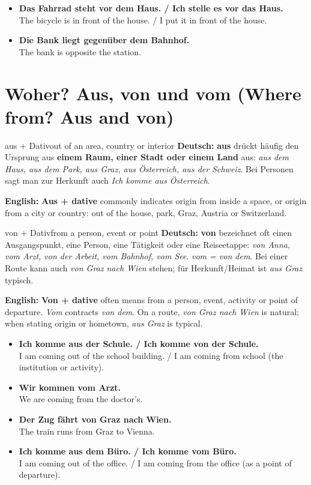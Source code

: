 \documentclass[a4paper,11pt]{article}
\newcommand{\GermanText}[1]{\textbf{Deutsch: }#1\par}
\newcommand{\EnglishText}[1]{{\small\color{SoftGray}\textbf{English: }#1\par}}
\newcommand{\ExampleItem}[2]{\item \textbf{#1}\\{\small\color{SoftGray}#2}}
\begin{document}
\begin{exbox}\begin{itemize}
\ExampleItem{Das Fahrrad steht vor dem Haus. / Ich stelle es vor das Haus.}{The bicycle is in front of the house. / I put it in front of the house.}
\ExampleItem{Die Bank liegt gegenüber dem Bahnhof.}{The bank is opposite the station.}
\end{itemize}\end{exbox}

\section{Woher? Aus, von und vom (Where from? Aus and von)}
\begin{grammarentry}{aus + Dativ}{out of an area, country or interior}
\GermanText{\textbf{aus} drückt häufig den Ursprung aus \textbf{einem Raum, einer Stadt oder einem Land} aus: \emph{aus dem Haus, aus dem Park, aus Graz, aus Österreich, aus der Schweiz}. Bei Personen sagt man zur Herkunft auch \emph{Ich komme aus Österreich}.}
\EnglishText{\textbf{Aus + dative} commonly indicates origin from inside a space, or origin from a city or country: out of the house, park, Graz, Austria or Switzerland.}
\end{grammarentry}
\begin{grammarentry}{von + Dativ}{from a person, event or point}
\GermanText{\textbf{von} bezeichnet oft einen Ausgangspunkt, eine Person, eine Tätigkeit oder eine Reiseetappe: \emph{von Anna, vom Arzt, von der Arbeit, vom Bahnhof, vom See}. \emph{vom = von dem}. Bei einer Route kann auch \emph{von Graz nach Wien} stehen; für Herkunft/Heimat ist \emph{aus Graz} typisch.}
\EnglishText{\textbf{Von + dative} often means from a person, event, activity or point of departure. \emph{Vom} contracts \emph{von dem}. On a route, \emph{von Graz nach Wien} is natural; when stating origin or hometown, \emph{aus Graz} is typical.}
\end{grammarentry}
\begin{exbox}\begin{itemize}
\ExampleItem{Ich komme aus der Schule. / Ich komme von der Schule.}{I am coming out of the school building. / I am coming from school (the institution or activity).}
\ExampleItem{Wir kommen vom Arzt.}{We are coming from the doctor's.}
\ExampleItem{Der Zug fährt von Graz nach Wien.}{The train runs from Graz to Vienna.}
\ExampleItem{Ich komme aus dem Büro. / Ich komme vom Büro.}{I am coming out of the office. / I am coming from the office (as a point of departure).}
\end{itemize}\end{exbox}
\end{document}
